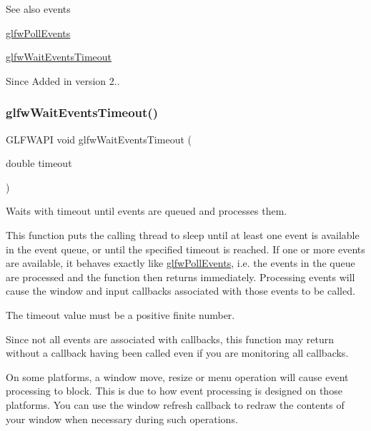 \begin{DoxySeeAlso}{See also}
events 

\hyperlink{group__window_ga872d16e4c77f58c0436f356255920cfc}{glfw\+Poll\+Events} 

\hyperlink{group__window_ga05223a0a4c5e50f10f289e60398153aa}{glfw\+Wait\+Events\+Timeout}
\end{DoxySeeAlso}
\begin{DoxySince}{Since}
Added in version 2.. 
\end{DoxySince}
\mbox{\label{group__window_ga05223a0a4c5e50f10f289e60398153aa}} 
\subsubsection{\texorpdfstring{glfw\+Wait\+Events\+Timeout()}{glfwWaitEventsTimeout()}}
{\footnotesize\ttfamily G\+L\+F\+W\+A\+PI void glfw\+Wait\+Events\+Timeout (\begin{DoxyParamCaption}\item[{double}]{timeout }\end{DoxyParamCaption})}



Waits with timeout until events are queued and processes them. 

This function puts the calling thread to sleep until at least one event is available in the event queue, or until the specified timeout is reached. If one or more events are available, it behaves exactly like \hyperlink{group__window_ga872d16e4c77f58c0436f356255920cfc}{glfw\+Poll\+Events}, i.\+e. the events in the queue are processed and the function then returns immediately. Processing events will cause the window and input callbacks associated with those events to be called.

The timeout value must be a positive finite number.

Since not all events are associated with callbacks, this function may return without a callback having been called even if you are monitoring all callbacks.

On some platforms, a window move, resize or menu operation will cause event processing to block. This is due to how event processing is designed on those platforms. You can use the window refresh callback to redraw the contents of your window when necessary during such operations.

